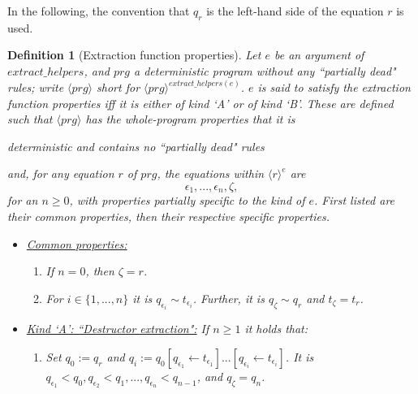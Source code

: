 \documentclass[11pt]{article} %
\newtheorem{definition}{Definition}
\begin{document}

In the following, the convention that $q_r$ is the left-hand side of the equation $r$ is used.

\begin{definition}[Extraction function properties]
Let $e$ be an argument of $extract\_helpers$, and $prg$ a deterministic program without any ``partially dead" rules; write $\langle prg \rangle$ short for $\langle prg \rangle^{extract\_helpers(e)}$. $e$ is said to satisfy the extraction function properties iff it is either of kind `A' or of kind `B'. These are defined such that $\langle prg \rangle$ has the whole-program properties that it is
\begin{center}
deterministic and contains no ``partially dead" rules
\end{center}
and, for any equation $r$ of $prg$, the equations within $\langle r \rangle^e$ are
\begin{equation*}
\epsilon_1, ..., \epsilon_n, \zeta,
\end{equation*}
for an $n \geq 0$, with properties partially specific to the kind of $e$. First listed are their common properties, then their respective specific properties.

\begin{itemize}
\item \underline{Common properties:}
\begin{enumerate}
\item If $n = 0$, then $\zeta = r$.
\item For $i \in \{1, ..., n\}$ it is $q_{\epsilon_i} \sim t_{\epsilon_i}$. Further, it is $q_\zeta \sim q_r$ and $t_\zeta = t_r$.
\end{enumerate}

\item \underline{Kind `A': ``Destructor extraction":} If $n \geq 1$ it holds that:
\begin{enumerate}
\item Set $q_0 := q_r$ and $q_i := q_0[q_{\epsilon_1} \leftarrow t_{\epsilon_1}]...[q_{\epsilon_i} \leftarrow t_{\epsilon_i}]$. It is $q_{\epsilon_1} < q_0, q_{\epsilon_2} < q_1, ..., q_{\epsilon_n} < q_{n-1}$, and $q_\zeta = q_n$.
\end{enumerate}


\end{itemize}
\end{definition}
\end{document}
